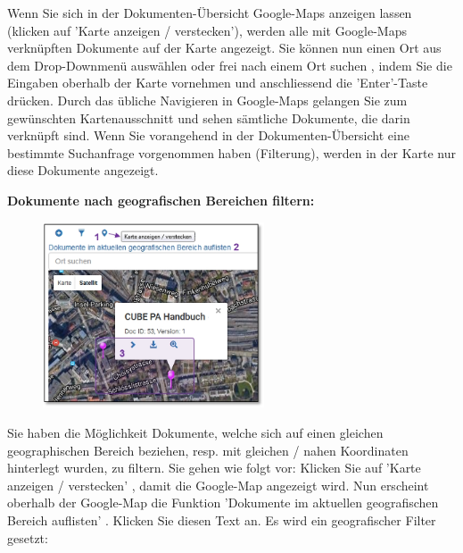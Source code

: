Wenn Sie sich in der Dokumenten-Übersicht Google-Maps anzeigen lassen (klicken auf 'Karte anzeigen / verstecken'), werden alle mit Google-Maps verknüpften Dokumente auf der Karte angezeigt. Sie können nun einen Ort aus dem Drop-Downmenü auswählen  oder frei nach einem Ort suchen , indem Sie die Eingaben oberhalb der Karte vornehmen  und anschliessend die 'Enter'-Taste drücken. Durch das übliche Navigieren in Google-Maps gelangen Sie zum gewünschten Kartenausschnitt und sehen sämtliche Dokumente, die darin verknüpft sind. Wenn Sie vorangehend in der Dokumenten-Übersicht eine bestimmte Suchanfrage vorgenommen haben (Filterung), werden in der Karte nur diese Dokumente angezeigt. \newline

\pagebreak
\textbf{Dokumente nach geografischen Bereichen filtern:} \\

\begin{figure}
  \vspace{-35pt}
  \begin{center}
    \includegraphics[height=55mm]{../chapters/11_Dokumentenablage/pictures/11-2-3_GeoBereichFilter.jpg}
  \end{center}
  \vspace{-20pt}
  \vspace{-10pt}
\end{figure}
Sie haben die Möglichkeit Dokumente, welche sich auf einen gleichen geographischen Bereich beziehen, resp. mit gleichen / nahen Koordinaten hinterlegt wurden, zu filtern. Sie gehen wie folgt vor: Klicken Sie auf 'Karte anzeigen / verstecken' , damit die Google-Map angezeigt wird. Nun erscheint oberhalb der Google-Map die Funktion 'Dokumente im aktuellen geografischen Bereich auflisten' . Klicken Sie diesen Text an. Es wird ein geografischer Filter gesetzt:

\vspace{1cm} 

